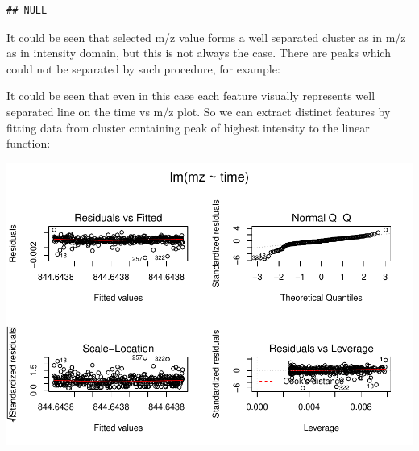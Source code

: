\documentclass[]{article}
\newenvironment{Shaded}{\begin{snugshade}}{\end{snugshade}}
\newcommand{\KeywordTok}[1]{\textcolor[rgb]{0.13,0.29,0.53}{\textbf{#1}}}
\newcommand{\DataTypeTok}[1]{\textcolor[rgb]{0.13,0.29,0.53}{#1}}
\newcommand{\DecValTok}[1]{\textcolor[rgb]{0.00,0.00,0.81}{#1}}
\newcommand{\StringTok}[1]{\textcolor[rgb]{0.31,0.60,0.02}{#1}}
\newcommand{\ControlFlowTok}[1]{\textcolor[rgb]{0.13,0.29,0.53}{\textbf{#1}}}
\newcommand{\OperatorTok}[1]{\textcolor[rgb]{0.81,0.36,0.00}{\textbf{#1}}}
\newcommand{\NormalTok}[1]{#1}
\begin{document}
\begin{verbatim}
## NULL
\end{verbatim}

It could be seen that selected m/z value forms a well separated cluster
as in m/z as in intensity domain, but this is not always the case. There
are peaks which could not be separated by such procedure, for example:

It could be seen that even in this case each feature visually represents
well separated line on the time vs m/z plot. So we can extract distinct
features by fitting data from cluster containing peak of highest
intensity to the linear function:

\begin{Shaded}
\end{Shaded}

\includegraphics{Supplementary_document_files/figure-latex/fit.lin-1.pdf}
\end{document}
